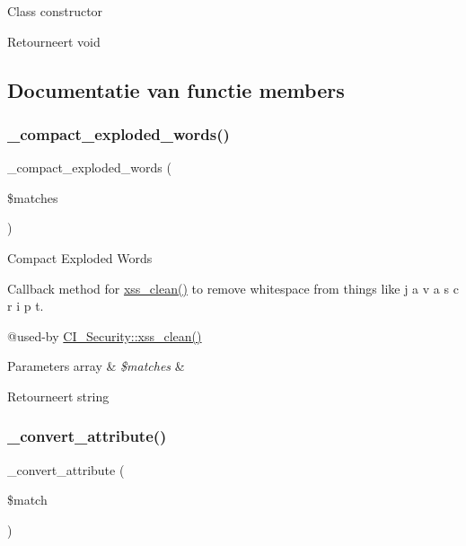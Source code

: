 Class constructor

\begin{DoxyReturn}{Retourneert}
void 
\end{DoxyReturn}


\subsection{Documentatie van functie members}
\mbox{\label{class_c_i___security_adfb0e251ae35ae40303a302d253c3ab2}} 
\subsubsection{\texorpdfstring{\_compact\_exploded\_words()}{\_compact\_exploded\_words()}}
{\footnotesize\ttfamily \+\_\+compact\+\_\+exploded\+\_\+words (\begin{DoxyParamCaption}\item[{}]{\$matches }\end{DoxyParamCaption})\hspace{0.3cm}{\ttfamily [protected]}}

Compact Exploded Words

Callback method for \mbox{\hyperlink{class_c_i___security_acb759426dbab128d3d8164805225381c}{xss\+\_\+clean()}} to remove whitespace from things like \textquotesingle{}j a v a s c r i p t\textquotesingle{}.

@used-\/by \mbox{\hyperlink{class_c_i___security_acb759426dbab128d3d8164805225381c}{C\+I\+\_\+\+Security\+::xss\+\_\+clean()}} 
\begin{DoxyParams}[1]{Parameters}
array & {\em \$matches} & \\
\hline
\end{DoxyParams}
\begin{DoxyReturn}{Retourneert}
string 
\end{DoxyReturn}
\mbox{\label{class_c_i___security_ae16451bcdc769285c499cbf8068b3523}} 
\subsubsection{\texorpdfstring{\_convert\_attribute()}{\_convert\_attribute()}}
{\footnotesize\ttfamily \+\_\+convert\+\_\+attribute (\begin{DoxyParamCaption}\item[{}]{\$match }\end{DoxyParamCaption})\hspace{0.3cm}{\ttfamily [protected]}}

